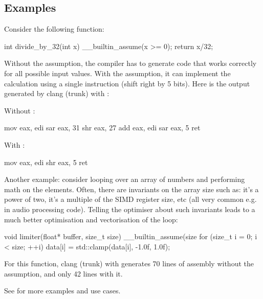 \subsection{Examples}

Consider the following function:

\begin{codeblock}
int divide_by_32(int x) 
{
  __builtin_assume(x >= 0);
  return x/32;
}
\end{codeblock}

Without the assumption, the compiler has to generate code that works correctly for all possible input values. With the assumption, it can implement the calculation using a single instruction (shift right by 5 bits). Here is the output generated by clang (trunk) with :

\begin{multicols}{2}
Without :

\begin{codeblock}
  mov eax, edi
  sar eax, 31
  shr eax, 27
  add eax, edi
  sar eax, 5
  ret
\end{codeblock}

\columnbreak

With :

\begin{codeblock}
  mov eax, edi
  shr eax, 5
  ret
\end{codeblock}

\end{multicols}

Another example: consider looping over an array of numbers and performing math on the elements. Often, there are invariants on the array size such as: it's a power of two, it's a multiple of the SIMD register size, etc (all very common e.g. in audio processing code). Telling the optimiser about such invariants leads to a much better optimisation and vectorisation of the loop:

\begin{codeblock}
void limiter(float* buffer, size_t size) 
{
  __builtin_assume(size %
  for (size_t i = 0; i < size; ++i)
     data[i] = std::clamp(data[i], -1.0f, 1.0f);
}
\end{codeblock}

For this function, clang (trunk) with  generates 70 lines of assembly without the assumption, and only 42 lines with it.

See \cite{Regehr2014} for more examples and use cases. 

